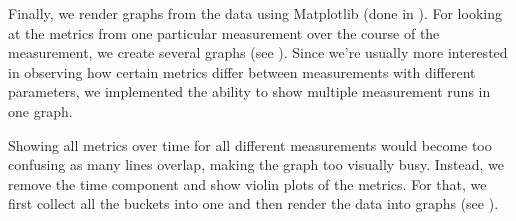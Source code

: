 Finally, we render graphs from the data using Matplotlib \cite{Matplotlib} (done in ).
For looking at the metrics from one particular measurement over the course of the measurement, we create several graphs (see ).
Since we're usually more interested in observing how certain metrics differ between measurements with different parameters, we implemented the ability to show multiple measurement runs in one graph.

Showing all metrics over time for all different measurements would become too confusing as many lines overlap, making the graph too visually busy.
Instead, we remove the time component and show violin plots of the metrics.
For that, we first collect all the buckets into one and then render the data into graphs (see ).


